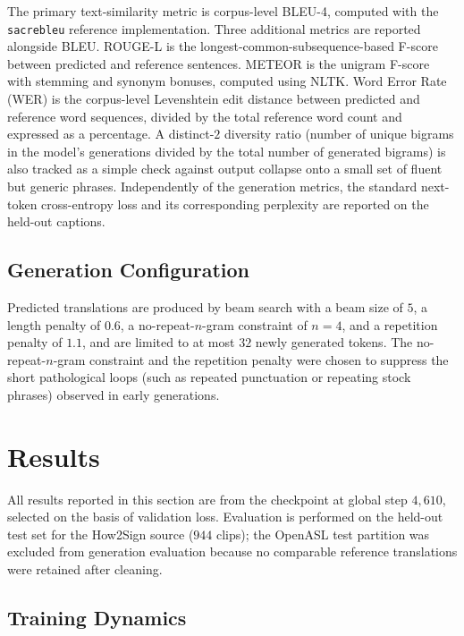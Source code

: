 \documentclass{article}
\begin{document}
The primary text-similarity metric is corpus-level BLEU-4, computed with the
\texttt{sacrebleu} reference implementation. Three additional metrics are
reported alongside BLEU. ROUGE-L is the longest-common-subsequence-based
F-score between predicted and reference sentences. METEOR is the unigram
F-score with stemming and synonym bonuses, computed using NLTK. Word Error
Rate (WER) is the corpus-level Levenshtein edit distance between predicted
and reference word sequences, divided by the total reference word count and
expressed as a percentage. A distinct-$2$ diversity ratio (number of unique
bigrams in the model's generations divided by the total number of generated
bigrams) is also tracked as a simple check against output collapse onto a
small set of fluent but generic phrases. Independently of the generation
metrics, the standard next-token cross-entropy loss and its corresponding
perplexity are reported on the held-out captions.

\subsection{Generation Configuration}
\label{sec:eval-gen}

Predicted translations are produced by beam search with a beam size of $5$,
a length penalty of $0.6$, a no-repeat-$n$-gram constraint of $n = 4$, and a
repetition penalty of $1.1$, and are limited to at most $32$ newly generated
tokens. The no-repeat-$n$-gram constraint and the repetition penalty were
chosen to suppress the short pathological loops (such as repeated
punctuation or repeating stock phrases) observed in early generations.

\section{Results}
\label{sec:results}

All results reported in this section are from the checkpoint at global step $4{,}610$,
selected on the basis of validation loss. Evaluation is performed on the held-out
test set for the How2Sign source ($944$ clips); the OpenASL test partition was
excluded from generation evaluation because no comparable reference translations
were retained after cleaning.

\subsection{Training Dynamics}
\label{sec:results-dynamics}
\end{document}
